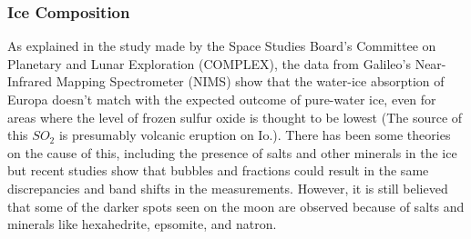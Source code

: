 \subsubsection{Ice Composition} 
As explained in the study made by the Space Studies Board's Committee on Planetary and Lunar Exploration (COMPLEX), the data from Galileo’s Near-Infrared Mapping Spectrometer (NIMS) show that the water-ice absorption of Europa doesn't match with the expected outcome of pure-water ice, even for areas where the level of frozen sulfur oxide is thought to be lowest (The source of this $SO_2$ is presumably volcanic eruption on Io.). There has been some theories on the cause of this, including the presence of salts and other minerals in the ice but recent studies show that bubbles and fractions could result in the same discrepancies and band shifts in the measurements. However, it is still believed that some of the darker spots seen on the moon are observed because of salts and minerals like hexahedrite, epsomite, and natron\cite{SciStrat}. %
\\
\\
